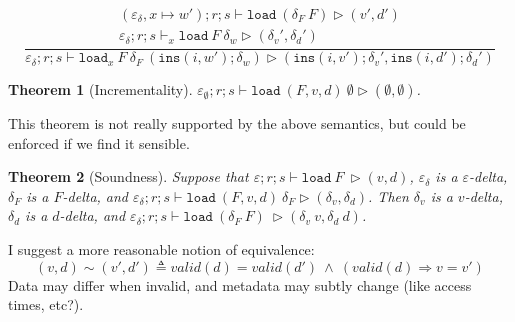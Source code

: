 \documentclass{report}
\theoremstyle{theorem}
\newtheorem{theorem}{Theorem}[section]
\begin{document}
\begin{displaymath}
	\frac{\begin{array}{c}
		(\varepsilon_\delta,x \mapsto w') ; r ; s \vdash \mathtt{load}~ (\delta_F ~F) \rhd (v',d')\\
		\varepsilon_\delta ; r ; s \vdash_x \mathtt{load}~F~\delta_w \rhd (\delta_v',\delta_d')
	\end{array}}
	{\varepsilon_\delta ; r ; s \vdash \mathtt{load}_x~F~ \delta_F ~(\mathtt{ins}(i,w');\delta_w) \rhd (\mathtt{ins}(i,v');\delta_v',\mathtt{ins}(i,d');\delta_d')}
\end{displaymath}

\begin{theorem}[Incrementality]
	$\varepsilon_\emptyset ; r ; s \vdash \mathtt{load}~ (F,v,d)~ \emptyset \rhd (\emptyset,\emptyset)$.
\end{theorem}
This theorem is not really supported by the above semantics, but could be enforced if we find it sensible.

\begin{theorem}[Soundness]
	Suppose that $\varepsilon ; r ; s \vdash \mathtt{load}~ F~ \rhd (v,d)$, $\varepsilon_\delta$ is a $\varepsilon$-delta, $\delta_F$ is a $F$-delta, and $\varepsilon_\delta ; r ; s \vdash \mathtt{load}~ (F,v,d)~ \delta_F \rhd (\delta_v,\delta_d)$.
	Then $\delta_v$ is a $v$-delta, $\delta_d$ is a $d$-delta, and $\varepsilon_\delta ; r ; s \vdash \mathtt{load}~ (\delta_F~F)~ \rhd (\delta_v~v,\delta_d~d)$.
\end{theorem}
	
I suggest a more reasonable notion of equivalence:
\begin{displaymath}
	(v,d) \sim (v',d') \triangleq valid(d)=valid(d') ~\wedge~ (valid(d) \Rightarrow v = v')
\end{displaymath}
Data may differ when invalid, and metadata may subtly change (like access times, etc?).
	
\end{document}
